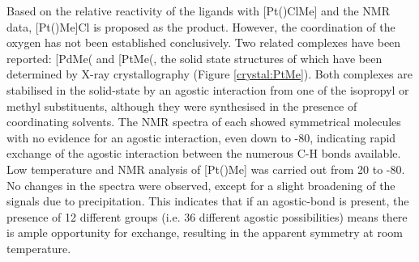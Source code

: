 
Based on the relative reactivity of the \tBuxantphos{} ligands with [Pt()ClMe] and the NMR data, [Pt(\tBuxantphos)Me]Cl is proposed as the product.  However, the coordination of the oxygen has not been established conclusively.  Two related complexes have been reported: [PdMe(\ce{P^{t}Bu3)2]+} and [PtMe(\ce{P^{i}Pr3)2]+}, the solid state structures of which have been determined by X-ray crystallography (Figure \ref{crystal:PtMe}).\cite{Ingleson2004, Walter2013}  Both complexes are stabilised in the solid-state by an agostic interaction from one of the isopropyl or \tBu{} methyl substituents, although they were synthesised in the presence of coordinating solvents.  The NMR spectra of each showed symmetrical molecules with no evidence for an agostic interaction, even down to -80\degC, indicating rapid exchange of the agostic interaction between the numerous C-H bonds available.  Low temperature \proton{} and \phosphorus{} NMR analysis of [Pt(\tBusixantphos)Me] was carried out from 20 to -80\degC.  No changes in the spectra were observed, except for a slight broadening of the signals due to precipitation.  This indicates that if an agostic-bond is present, the presence of 12 different \tBu{}  groups (i.e. 36 different agostic possibilities) means there is ample opportunity for exchange, resulting in the apparent symmetry at room temperature.  

